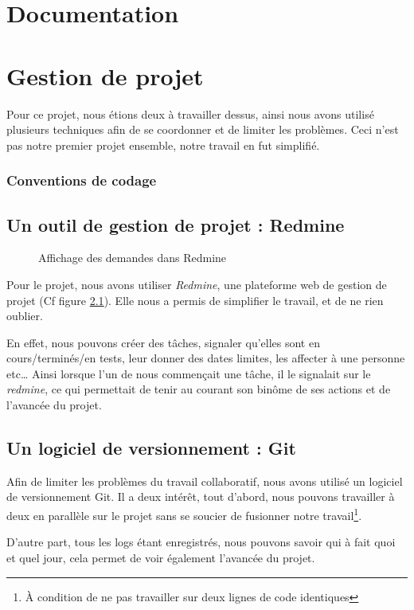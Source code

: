 \documentclass[12pt,a4paper,openany]{book}
\begin{document}
	\chapter{Documentation}
	\chapter{Gestion de projet}
	Pour ce projet, nous étions deux à travailler dessus, ainsi nous avons utilisé plusieurs techniques afin de se coordonner et de limiter les problèmes. Ceci
	n'est pas notre premier projet ensemble, notre travail en fut simplifié.
	\subsection{Conventions de codage}
	\section{Un outil de gestion de projet : Redmine}
	\begin{figure}[H]
		\centering
		\caption{Affichage des demandes dans Redmine}
		\label{fig:redmine}
	\end{figure}
	Pour le projet, nous avons utiliser \textit{Redmine}, une plateforme web de gestion de projet (Cf figure \ref{fig:redmine}). Elle nous a permis de simplifier le travail, et
	de ne rien oublier.

	En effet, nous pouvons créer des tâches, signaler qu'elles sont en cours/terminés/en tests, leur donner des dates limites, les affecter à une personne etc\ldots
	Ainsi lorsque l'un de nous commençait une tâche, il le signalait sur le \textit{redmine}, ce qui permettait de tenir au courant son binôme de ses actions et
	de l'avancée du projet.

	\section{Un logiciel de versionnement : Git}
	Afin de limiter les problèmes du travail collaboratif, nous avons utilisé un logiciel de versionnement Git. Il a deux intérêt, tout d'abord, nous pouvons
	travailler à deux en parallèle sur le projet sans se soucier de fusionner notre travail\footnote{À condition de ne pas travailler sur deux lignes de code
	identiques}.

	D'autre part, tous les logs étant enregistrés, nous pouvons savoir qui à fait quoi et quel jour, cela permet de voir également l'avancée du projet. 
\end{document}
